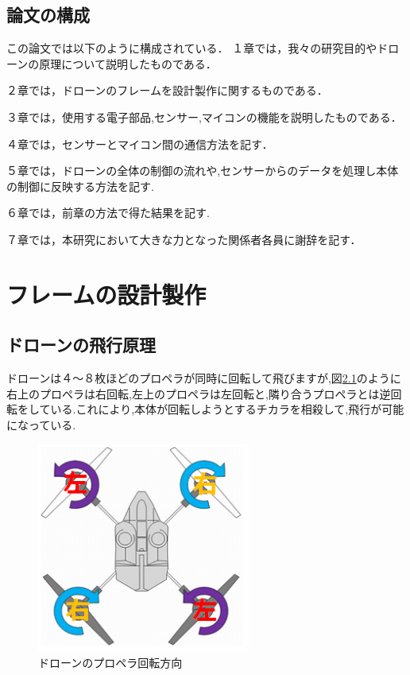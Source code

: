\documentclass[12pt,oneside]{paper}
\begin{document}
\section{論文の構成}
この論文では以下のように構成されている．
１章では，我々の研究目的やドローンの原理について説明したものである．


２章では，ドローンのフレームを設計製作に関するものである．


３章では，使用する電子部品,センサー,マイコンの機能を説明したものである．


４章では，センサーとマイコン間の通信方法を記す．


５章では，ドローンの全体の制御の流れや,センサーからのデータを処理し本体の制御に反映する方法を記す.


６章では，前章の方法で得た結果を記す.


７章では，本研究において大きな力となった関係者各員に謝辞を記す．
\chapter{フレームの設計製作}

\section{ドローンの飛行原理}
ドローンは４～８枚ほどのプロペラが同時に回転して飛びますが,図\ref{fig:gen}のように右上のプロペラは右回転,左上のプロペラは左回転と,隣り合うプロペラとは逆回転をしている.これにより,本体が回転しようとするチカラを相殺して,飛行が可能になっている.

\begin{figure}[H]
  \begin{center}
    \includegraphics[width=70mm]{ga/gen.png}
    \end{center}
  \caption{ドローンのプロペラ回転方向}
 \label{fig:gen}
\end{figure}
\end{document}
